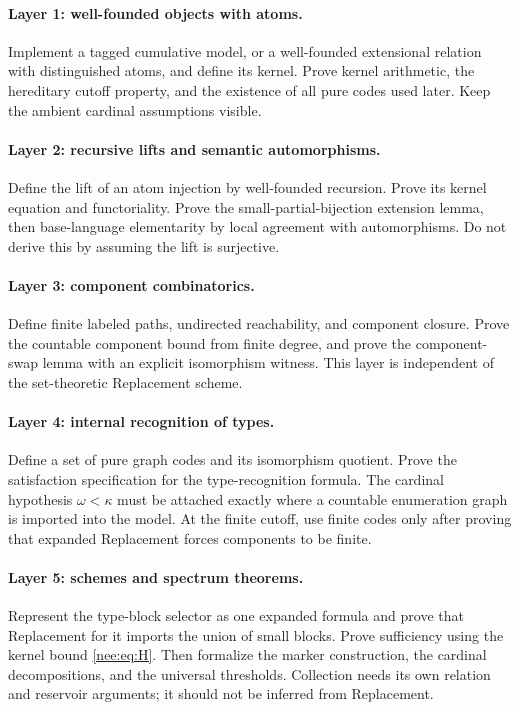 \documentclass[11pt,letterpaper]{article}
\numberwithin{equation}{section}
\theoremstyle{plain}
\theoremstyle{definition}
\theoremstyle{remark}
\begin{document}
\paragraph{Layer 1: well-founded objects with atoms.}
Implement a tagged cumulative model, or a well-founded extensional relation with distinguished atoms, and define its kernel. Prove kernel arithmetic, the hereditary cutoff property, and the existence of all pure codes used later. Keep the ambient cardinal assumptions visible.

\paragraph{Layer 2: recursive lifts and semantic automorphisms.}
Define the lift of an atom injection by well-founded recursion. Prove its kernel equation and functoriality. Prove the small-partial-bijection extension lemma, then base-language elementarity by local agreement with automorphisms. Do not derive this by assuming the lift is surjective.

\paragraph{Layer 3: component combinatorics.}
Define finite labeled paths, undirected reachability, and component closure. Prove the countable component bound from finite degree, and prove the component-swap lemma with an explicit isomorphism witness. This layer is independent of the set-theoretic Replacement scheme.

\paragraph{Layer 4: internal recognition of types.}
Define a set of pure graph codes and its isomorphism quotient. Prove the satisfaction specification for the type-recognition formula. The cardinal hypothesis $\omega<\kappa$ must be attached exactly where a countable enumeration graph is imported into the model. At the finite cutoff, use finite codes only after proving that expanded Replacement forces components to be finite.

\paragraph{Layer 5: schemes and spectrum theorems.}
Represent the type-block selector as one expanded formula and prove that Replacement for it imports the union of small blocks. Prove sufficiency using the kernel bound \eqref{nee:eq:H}. Then formalize the marker construction, the cardinal decompositions, and the universal thresholds. Collection needs its own relation and reservoir arguments; it should not be inferred from Replacement.
\end{document}
